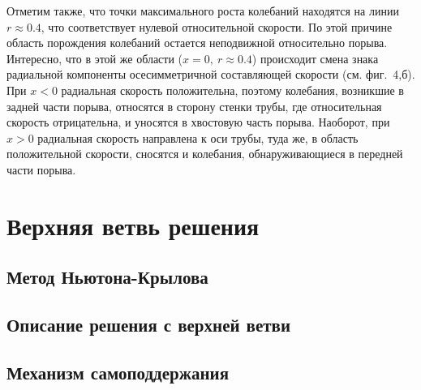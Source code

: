 Отметим также, что точки максимального роста колебаний находятся на линии $r\approx0.4$, что соответствует нулевой относительной скорости. По этой причине область порождения колебаний остается неподвижной относительно порыва. Интересно, что в этой же области ($x=0,\ r\approx0.4$) происходит смена знака радиальной компоненты осесимметричной составляющей скорости (см. фиг.~4,б). При $x<0$ радиальная скорость положительна, поэтому колебания, возникшие в задней части порыва, относятся в сторону стенки трубы, где относительная скорость отрицательна, и уносятся в хвостовую часть порыва. Наоборот, при $x>0$ радиальная скорость направлена к оси трубы, туда же, в область положительной скорости, сносятся и колебания, обнаруживающиеся в передней части порыва.



\section{Верхняя ветвь решения}
\subsection*{}
\subsection{Метод Ньютона-Крылова}
\subsection{Описание решения с верхней ветви}
\subsection{Механизм самоподдержания}



